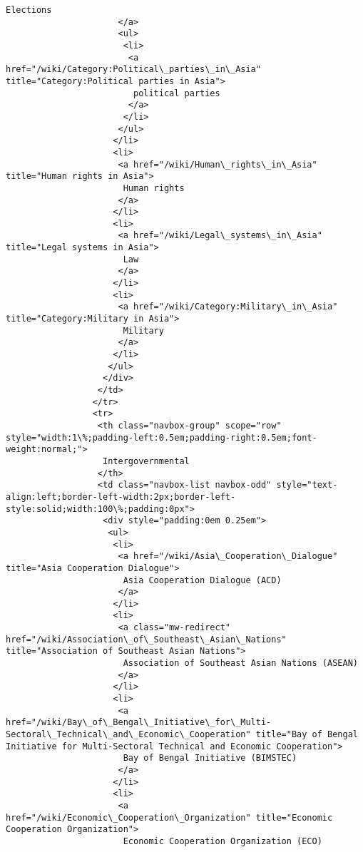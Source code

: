 \documentclass[11pt]{article}
\begin{document}
\begin{Verbatim}[commandchars=\\\{\}]
                       Elections
                      </a>
                      <ul>
                       <li>
                        <a href="/wiki/Category:Political\_parties\_in\_Asia" title="Category:Political parties in Asia">
                         political parties
                        </a>
                       </li>
                      </ul>
                     </li>
                     <li>
                      <a href="/wiki/Human\_rights\_in\_Asia" title="Human rights in Asia">
                       Human rights
                      </a>
                     </li>
                     <li>
                      <a href="/wiki/Legal\_systems\_in\_Asia" title="Legal systems in Asia">
                       Law
                      </a>
                     </li>
                     <li>
                      <a href="/wiki/Category:Military\_in\_Asia" title="Category:Military in Asia">
                       Military
                      </a>
                     </li>
                    </ul>
                   </div>
                  </td>
                 </tr>
                 <tr>
                  <th class="navbox-group" scope="row" style="width:1\%;padding-left:0.5em;padding-right:0.5em;font-weight:normal;">
                   Intergovernmental
                  </th>
                  <td class="navbox-list navbox-odd" style="text-align:left;border-left-width:2px;border-left-style:solid;width:100\%;padding:0px">
                   <div style="padding:0em 0.25em">
                    <ul>
                     <li>
                      <a href="/wiki/Asia\_Cooperation\_Dialogue" title="Asia Cooperation Dialogue">
                       Asia Cooperation Dialogue (ACD)
                      </a>
                     </li>
                     <li>
                      <a class="mw-redirect" href="/wiki/Association\_of\_Southeast\_Asian\_Nations" title="Association of Southeast Asian Nations">
                       Association of Southeast Asian Nations (ASEAN)
                      </a>
                     </li>
                     <li>
                      <a href="/wiki/Bay\_of\_Bengal\_Initiative\_for\_Multi-Sectoral\_Technical\_and\_Economic\_Cooperation" title="Bay of Bengal Initiative for Multi-Sectoral Technical and Economic Cooperation">
                       Bay of Bengal Initiative (BIMSTEC)
                      </a>
                     </li>
                     <li>
                      <a href="/wiki/Economic\_Cooperation\_Organization" title="Economic Cooperation Organization">
                       Economic Cooperation Organization (ECO)

\end{Verbatim}
\end{document}
